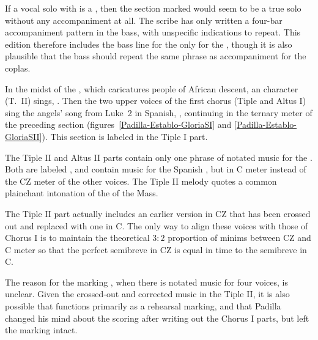 If a vocal solo with  is a , then the section marked 
 would seem to be a true solo without any accompaniment 
at all.
The scribe has only written a four-bar accompaniment pattern in the bass, with 
unspecific indications to repeat.
This edition therefore includes the bass line for the  only 
for the , though it is also plausible that the bass should
repeat the same phrase as accompaniment for the coplas.


In the midst of the , which caricatures people of African
descent, an  character (T.~II) sings, .
Then the two upper voices of the first chorus (Tiple and Altus I) sing the 
angels' song from Luke~2 in Spanish, , continuing in the ternary meter of the preceding section
(figures~\ref{Padilla-Establo-GloriaSI} and \ref{Padilla-Establo-GloriaSII}).
This section is labeled  in the Tiple I part.

The Tiple II and Altus II parts contain only one phrase of notated music for 
the .
Both are labeled , and contain music for the 
Spanish , but in C meter instead of the CZ meter of the other 
voices.
The Tiple II melody quotes a common plainchant intonation of 
the  of the Mass.

The Tiple II part actually includes an earlier version in CZ that has been 
crossed out and replaced with one in C.
The only way to align these voices with those of Chorus I is to maintain the 
theoretical $3:2$ proportion of minims between CZ and C meter so that the 
perfect semibreve in CZ is equal in time to the semibreve in C.

The reason for the marking , when there is notated music for four 
voices, is unclear.
Given the crossed-out and corrected music in the Tiple II, it is also possible 
that  functions primarily as a rehearsal marking, and that Padilla 
changed his mind about the scoring after writing out the Chorus I parts, but 
left the marking intact.

